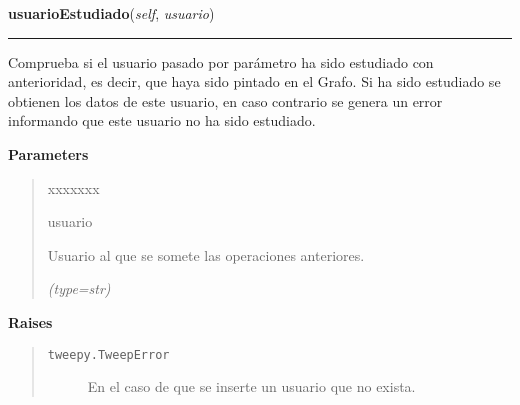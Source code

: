     \label{funcionesTwitter:FuncionesTwitter:usuarioEstudiado}

    \vspace{0.5ex}

\hspace{.8\funcindent}\begin{boxedminipage}{\funcwidth}

    \raggedright \textbf{usuarioEstudiado}(\textit{self}, \textit{usuario})

    \vspace{-1.5ex}

    \rule{\textwidth}{0.5\fboxrule}
\setlength{\parskip}{2ex}
    Comprueba si el usuario pasado por parámetro ha sido estudiado con 
    anterioridad, es decir, que haya sido pintado en el Grafo. Si ha sido 
    estudiado se obtienen los datos de este usuario, en caso contrario se 
    genera un error informando que este usuario no ha sido estudiado.

\setlength{\parskip}{1ex}
      \textbf{Parameters}
      \vspace{-1ex}

      \begin{quote}
        \begin{Ventry}{xxxxxxx}

          \item[usuario]

          Usuario al que se somete las operaciones anteriores.

            {\it (type=str)}

        \end{Ventry}

      \end{quote}

      \textbf{Raises}
    \vspace{-1ex}

      \begin{quote}
        \begin{description}

          \item[\texttt{tweepy.TweepError}]

          En el caso de que se inserte un usuario que no exista.

        \end{description}

      \end{quote}

    \end{boxedminipage}

